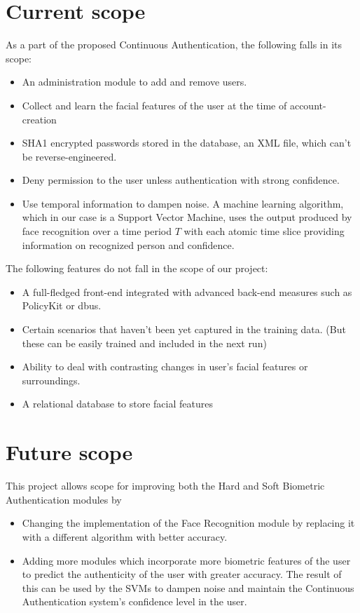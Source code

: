 \documentclass[12pt]{report}			%
\begin{document}
\section{ Current scope }
As a part of the proposed Continuous Authentication, the following falls in its scope:
\begin{itemize}
	\item An administration module to add and remove users.
	\item Collect and learn the facial features of the user at the time of account-creation
	\item SHA1 encrypted passwords stored in the database, an XML file, which can't be reverse-engineered.
	\item Deny permission to the user unless authentication with strong confidence.
	\item Use temporal information to dampen noise. A machine learning algorithm, which in our case is a Support Vector Machine, uses the output produced by face recognition over a time period $T$ with each atomic time slice providing information on recognized person and confidence.
\end{itemize}

\noindent The following features do not fall in the scope of our project:
\begin{itemize}
	\item A full-fledged front-end integrated with advanced back-end measures such as PolicyKit or dbus. 
	\item Certain scenarios that haven't been yet captured in the training data. (But these can be easily trained and included in the next run)
	\item Ability to deal with contrasting changes in user's facial features or surroundings.
	\item A relational database to store facial features
\end{itemize}

\section{ Future scope } 
This project allows scope for improving both the Hard and Soft Biometric Authentication modules by
\begin{itemize}
\item Changing the implementation of the Face Recognition module by replacing it with a different algorithm with better accuracy.
\item Adding more modules which incorporate more biometric features of the user to predict the authenticity of the user with greater accuracy. The result of this can be used by the SVMs to dampen noise and maintain the Continuous Authentication system's confidence level in the user.  
\end{itemize}
\end{document}
